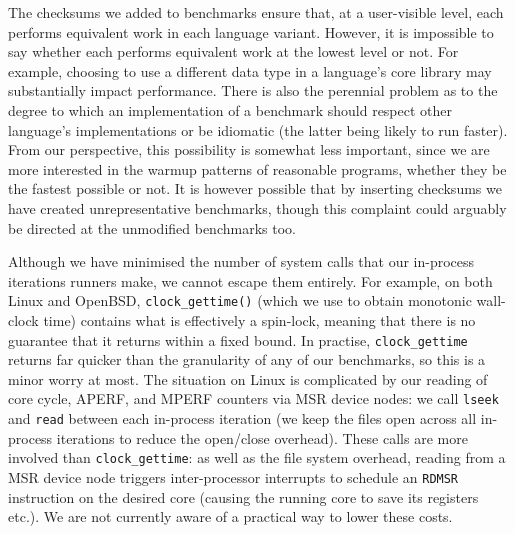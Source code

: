 \documentclass[preprint,numbers,10pt]{sigplanconf}
\begin{document}
The checksums we added to benchmarks ensure that, at a user-visible level, each
performs equivalent work in each language variant. However, it is impossible to
say whether each performs equivalent work at the lowest level or not. For
example, choosing to use a different data type in a language's core library may
substantially impact performance. There is also the perennial problem as to the
degree to which an implementation of a benchmark should respect other
language's implementations or be idiomatic (the latter being likely to
run faster). From our perspective, this possibility is somewhat less important,
since we are more interested in the warmup patterns of reasonable programs,
whether they be the fastest possible or not. It is however possible that by
inserting checksums we have created unrepresentative benchmarks, though
this complaint could arguably be directed at the unmodified benchmarks too.

Although we have minimised the number of system calls that our in-process
iterations runners make, we cannot escape them entirely. For example,
on both Linux and OpenBSD, \texttt{clock\_gettime()} (which we use to obtain
monotonic wall-clock time) contains what is effectively a spin-lock,
meaning that there is no guarantee that it returns within a fixed bound.
In practise, \texttt{clock\_gettime} returns far quicker than the granularity
of any of our benchmarks, so this is a minor worry at most. \label{aperf/mperf error} The situation
on Linux is complicated by our reading of core cycle, APERF, and MPERF
counters via MSR device nodes: we call \texttt{lseek} and \texttt{read}
between each in-process iteration (we keep the files open across all
in-process iterations to reduce the open/close overhead).
These calls are more involved than \texttt{clock\_gettime}:
as well as the file system overhead, reading from a MSR device
node triggers inter-processor interrupts to schedule an \texttt{RDMSR}
instruction on the desired core (causing the running core to save its registers etc.).
We are not currently aware of a practical way to lower these costs.
\end{document}
